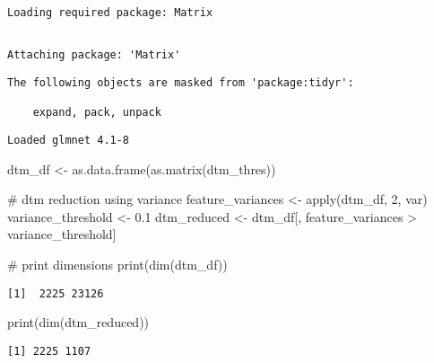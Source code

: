 \documentclass[
  12pt,
  letterpaper,
  DIV=11,
  numbers=noendperiod]{scrartcl}
\newenvironment{Shaded}{\begin{snugshade}}{\end{snugshade}}
\newcommand{\CommentTok}[1]{\textcolor[rgb]{0.37,0.37,0.37}{#1}}
\newcommand{\DecValTok}[1]{\textcolor[rgb]{0.68,0.00,0.00}{#1}}
\newcommand{\FloatTok}[1]{\textcolor[rgb]{0.68,0.00,0.00}{#1}}
\newcommand{\FunctionTok}[1]{\textcolor[rgb]{0.28,0.35,0.67}{#1}}
\newcommand{\NormalTok}[1]{\textcolor[rgb]{0.00,0.23,0.31}{#1}}
\newcommand{\OtherTok}[1]{\textcolor[rgb]{0.00,0.23,0.31}{#1}}
\newcommand{\SpecialCharTok}[1]{\textcolor[rgb]{0.37,0.37,0.37}{#1}}
\begin{document}
\begin{verbatim}
Loading required package: Matrix
\end{verbatim}

\begin{verbatim}

Attaching package: 'Matrix'
\end{verbatim}

\begin{verbatim}
The following objects are masked from 'package:tidyr':

    expand, pack, unpack
\end{verbatim}

\begin{verbatim}
Loaded glmnet 4.1-8
\end{verbatim}

\begin{Shaded}
\begin{Highlighting}[]
\NormalTok{dtm\_df }\OtherTok{\textless{}{-}} \FunctionTok{as.data.frame}\NormalTok{(}\FunctionTok{as.matrix}\NormalTok{(dtm\_thres))}

\CommentTok{\# dtm reduction using variance}
\NormalTok{feature\_variances }\OtherTok{\textless{}{-}} \FunctionTok{apply}\NormalTok{(dtm\_df, }\DecValTok{2}\NormalTok{, var)}
\NormalTok{variance\_threshold }\OtherTok{\textless{}{-}} \FloatTok{0.1}
\NormalTok{dtm\_reduced }\OtherTok{\textless{}{-}}\NormalTok{ dtm\_df[, feature\_variances }\SpecialCharTok{\textgreater{}}\NormalTok{ variance\_threshold]}

\CommentTok{\# print dimensions}
\FunctionTok{print}\NormalTok{(}\FunctionTok{dim}\NormalTok{(dtm\_df))}
\end{Highlighting}
\end{Shaded}

\begin{verbatim}
[1]  2225 23126
\end{verbatim}

\begin{Shaded}
\begin{Highlighting}[]
\FunctionTok{print}\NormalTok{(}\FunctionTok{dim}\NormalTok{(dtm\_reduced))}
\end{Highlighting}
\end{Shaded}

\begin{verbatim}
[1] 2225 1107
\end{verbatim}
\end{document}
